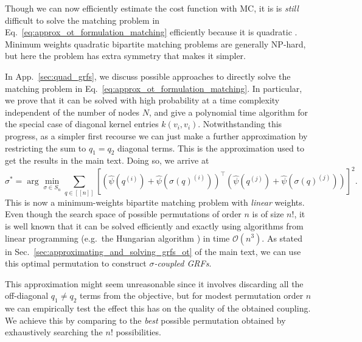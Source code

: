 Though we can now efficiently estimate the cost function with MC, it is is \emph{still} difficult to solve the matching problem in Eq.~\ref{eq:approx_ot_formulation_matching} efficiently because it is quadratic \citep{finke1987quadratic, burkard1998quadratic}.
Minimum weights quadratic bipartite matching problems are generally NP-hard, but here the problem has extra symmetry that makes it simpler.

In App.~\ref{sec:quad_grfs}, we discuss possible approaches to directly solve the matching problem in Eq.~\ref{eq:approx_ot_formulation_matching}. 
In particular, we prove that it can be solved with high probability at a time complexity independent of the number of nodes $N$, and give a polynomial time algorithm for the special case of diagonal kernel entries $k(v_i,v_i)$. 
Notwithstanding this progress, as a simpler first recourse we can just make a further approximation by restricting the sum to $q_1 = q_2$ diagonal terms.
This is the approximation used to get the results in the main text.
Doing so, we arrive at 
\small
\begin{equation} \label{eq:tractable_ot_formulation}
    \sigma^* = \arg \min_{\sigma \in S_n}  \sum_{q \in [\![n]\!]} \left [ \left( \widehat{\psi}( q^{(i)}) + \widehat{\psi}( \sigma(q)^{(i)}) \right)^\top \left( \widehat{\psi}( q^{(j)}) + \widehat{\psi}( \sigma(q)^{(j)}) \right) \right]^2. 
\end{equation}
\normalsize
This is now a minimum-weights bipartite matching problem with \emph{linear} weights. 
Even though the search space of possible permutations of order $n$ is of size $n!$, it is well known that it can be solved efficiently and exactly using algorithms from linear programming (e.g.~the Hungarian algorithm \citep{kuhn1955hungarian}) in time $\mathcal{O}(n^3)$. 
As stated in Sec.~\ref{sec:approximating_and_solving_grfs_ot} of the main text, we can use this optimal permutation to construct \emph{$\sigma$-coupled GRFs}.

This approximation might seem unreasonable since it involves discarding all the off-diagonal $q_1 \neq q_2$ terms from the objective, but for modest permutation order $n$ we can empirically test the effect this has on the quality of the obtained coupling.
We achieve this by comparing to the \emph{best} possible permutation obtained by exhaustively searching the $n!$ possibilities.

